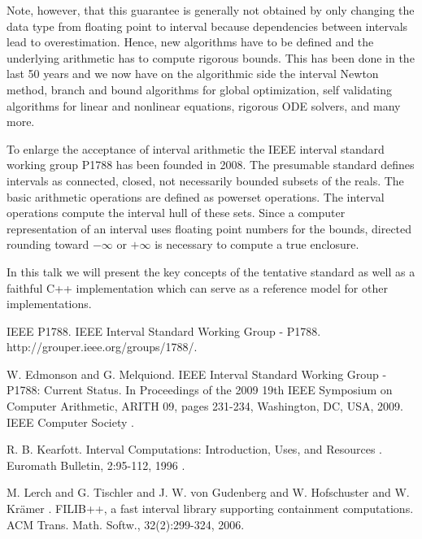 \documentclass[article,A4,11pt]{llncs}%
\begin{document}
Note, however, that this guarantee is generally not obtained by only changing 
the data type from floating point to interval because dependencies between 
intervals lead to overestimation. Hence, new algorithms have to be defined and 
the underlying arithmetic has to compute rigorous bounds. 
This has been done in the last 50 years and we 
now have on the algorithmic side  
the interval Newton method, 
branch and bound algorithms for global optimization, 
self validating algorithms for linear and nonlinear equations, 
rigorous ODE solvers, 
and many more. 
 
To enlarge the acceptance of interval arithmetic the IEEE interval 
standard working group P1788 has been founded in 2008. 
The presumable 
standard  defines intervals as connected, closed, not necessarily 
 bounded subsets of the reals. 
 The basic arithmetic operations are defined as powerset 
 operations. 
 The interval operations compute the interval hull of these sets. 
Since a computer representation of an interval uses floating point numbers for 
the bounds, directed rounding toward $-\infty$ or $+\infty$ is necessary to 
compute a true enclosure. 

In this talk we will present the key concepts of the tentative standard as 
well as a faithful C++ implementation  which can serve as a reference model for 
other implementations. 


\begin{thebibliography}{10}
{\sc IEEE P1788}. {IEEE Interval Standard Working Group - P1788}. http://grouper.ieee.org/groups/1788/.

{\sc W. Edmonson and G. Melquiond}. {IEEE Interval Standard Working Group - P1788: Current Status}. In Proceedings of the 2009 19th IEEE Symposium on Computer Arithmetic, ARITH 09, pages 231-234, Washington, DC, USA, 2009. IEEE Computer Society .

{\sc R. B. Kearfott}. {Interval Computations: Introduction, Uses, and Resources }. Euromath Bulletin, 2:95-112, 1996 .

{\sc M. Lerch and G. Tischler and J. W. von Gudenberg and W. Hofschuster and W. Kr\"amer }. {FILIB++, a fast interval library supporting containment computations}. ACM Trans. Math. Softw., 32(2):299-324, 2006.
\end{thebibliography}
\end{document}
